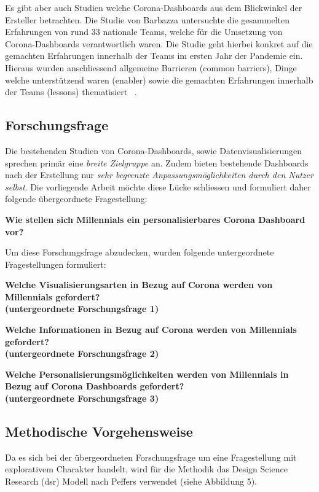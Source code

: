 \documentclass[12pt, oneside]{article}
\begin{document}
Es gibt aber auch Studien welche Corona-Dashboards aus dem Blickwinkel der Ersteller betrachten. Die Studie von Barbazza untersuchte die gesammelten Erfahrungen von rund 33 nationale Teams, welche für die Umsetzung von Corona-Dashboards verantwortlich waren. Die Studie geht hierbei konkret auf die gemachten Erfahrungen innerhalb der Teams im ersten Jahr der Pandemie ein. Hieraus wurden anschliessend allgemeine Barrieren (common barriers), Dinge welche unterstützend waren (enabler) sowie die gemachten Erfahrungen innerhalb der Teams (lessons) thematisiert ~\citep{Barbazza.}.

\subsection{Forschungsfrage}
Die bestehenden Studien von Corona-Dashboards, sowie Datenvisualisierungen sprechen primär eine \textit{breite Zielgruppe} an. Zudem bieten bestehende Dashboards nach der Erstellung nur \textit{sehr begrenzte Anpassungsmöglichkeiten durch den Nutzer selbst}. Die vorliegende Arbeit möchte diese Lücke schliessen und formuliert daher folgende übergeordnete Fragestellung:

\begin{center}
\textbf{Wie stellen sich Millennials ein personalisierbares Corona Dashboard vor?}
\end{center}

Um diese Forschungsfrage abzudecken, wurden folgende untergeordnete Fragestellungen formuliert:

\begin{center}
\textbf{Welche Visualisierungsarten in Bezug auf Corona werden von Millennials gefordert?\\
(untergeordnete Forschungsfrage 1)}
\end{center}

\begin{center}
\textbf{Welche Informationen in Bezug auf Corona werden von Millennials gefordert?\\
(untergeordnete Forschungsfrage 2)}
\end{center}

\begin{center}
\textbf{Welche Personalisierungsmöglichkeiten werden von Millennials in Bezug auf Corona Dashboards gefordert?\\
(untergeordnete Forschungsfrage 3)}
\end{center}

\subsection{Methodische Vorgehensweise}
Da es sich bei der übergeordneten Forschungsfrage um eine Fragestellung mit explorativem Charakter handelt, wird für die Methodik das Design Science Research (\Gls{dsr}) Modell nach Peffers verwendet (siehe Abbildung 5).
\end{document}

